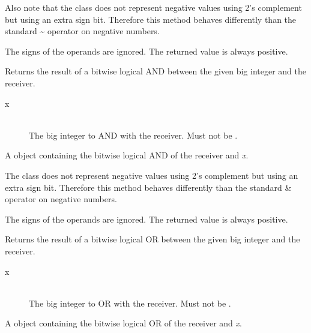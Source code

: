Also note that the  class does not represent negative values using 2's complement but using an extra sign bit. Therefore this method behaves differently than the standard \textasciitilde{} operator on negative numbers.

The signs of the operands are ignored. The returned value is always positive.



Returns the result of a bitwise logical AND between the given big integer and the receiver.


\docparams

\begin{description}
\item[x] \hfill \\ The big integer to AND with the receiver. Must not be .
\end{description}

\docretval

A  object containing the bitwise logical AND of the receiver and \emph{x}.

\docdiscuss

The  class does not represent negative values using 2's complement but using an extra sign bit. Therefore this method behaves differently than the standard \& operator on negative numbers.

The signs of the operands are ignored. The returned value is always positive.



Returns the result of a bitwise logical OR between the given big integer and the receiver.


\docparams

\begin{description}
\item[x] \hfill \\ The big integer to OR with the receiver. Must not be .
\end{description}

\docretval

A  object containing the bitwise logical OR of the receiver and \emph{x}.

